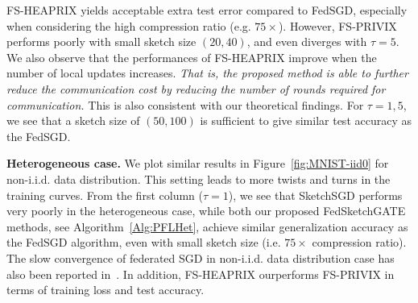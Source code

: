 \documentclass[twoside]{article}
\begin{document}
FS-HEAPRIX yields acceptable extra test error compared to FedSGD, especially when considering the high compression ratio (e.g. $75\times$). 
However, FS-PRIVIX performs poorly with small sketch size $(20,40)$, and even diverges with $\tau=5$. 
We also observe that the performances of FS-HEAPRIX improve when the number of local updates increases. 
\emph{That is, the proposed method is able to further reduce the communication cost by reducing the number of rounds required for communication.} 
This is also consistent with our theoretical findings. 
For $\tau=1,5$, we see that a sketch size of $(50,100)$ is sufficient to give similar test accuracy as the FedSGD.


\textbf{Heterogeneous case.} We plot similar results in Figure~\ref{fig:MNIST-iid0} for non-i.i.d. data distribution. 
This setting leads to more twists and turns in the training curves. 
From the first column ($\tau=1$), we see that SketchSGD performs very poorly in the heterogeneous case, while both our proposed FedSketchGATE methods, see Algorithm~\ref{Alg:PFLHet}, achieve similar generalization accuracy as the FedSGD algorithm, even with small sketch size (i.e. $75\times$ compression ratio). 
The slow convergence of federated SGD in non-i.i.d. data distribution case has also been reported in~\cite{mcmahan2016communication,chen2020toward}. 
In addition, FS-HEAPRIX ourperforms FS-PRIVIX in terms of training loss and test accuracy.
\end{document}
